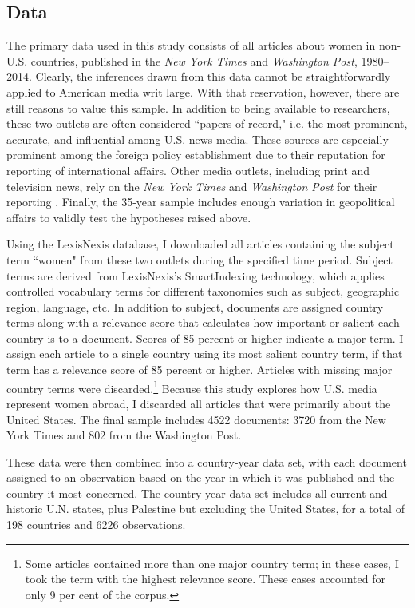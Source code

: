 \documentclass[11pt, oneside]{article}
\begin{document}
\subsection{Data}

The primary data used in this study consists of all articles about women in non-U.S. countries, published in the \emph{New York Times} and \emph{Washington Post}, 1980--2014. Clearly, the inferences drawn from this data cannot be straightforwardly applied to American media writ large. With that reservation, however, there are still reasons to value this sample. In addition to being available to researchers, these two outlets are often considered ``papers of record," i.e. the most prominent, accurate, and influential among U.S. news media. These sources are especially prominent among the foreign policy establishment due to their reputation for reporting of international affairs. Other media outlets, including print and television news, rely on the \emph{New York Times} and \emph{Washington Post} for their reporting \cite{schraeder1998}. Finally, the 35-year sample includes enough variation in geopolitical affairs to validly test the hypotheses raised above.

Using the LexisNexis database, I downloaded all articles containing the subject term ``women" from these two outlets during the specified time period. Subject terms are derived from LexisNexis's SmartIndexing technology, which applies controlled vocabulary terms for different taxonomies such as subject, geographic region, language, etc. In addition to subject, documents are assigned country terms along with a relevance score that calculates how important or salient each country is to a document. Scores of 85 percent or higher indicate a major term. I assign each article to a single country using its most salient country term, if that term has a relevance score of 85 percent or higher. Articles with missing major country terms were discarded.\footnote{\hspace{5}Some articles contained more than one major country term; in these cases, I took the term with the highest relevance score. These cases accounted for only 9 per cent of the corpus.}  Because this study explores how U.S. media represent women abroad, I discarded all articles that were primarily about the United States. The final sample includes 4522 documents: 3720 from the New York Times and 802 from the Washington Post. 

These data were then combined into a country-year data set, with each document assigned to an observation based on the year in which it was published and the country it most concerned. The country-year data set includes all current and historic U.N. states, plus Palestine but excluding the United States, for a total of 198 countries and 6226 observations. 
\end{document}
